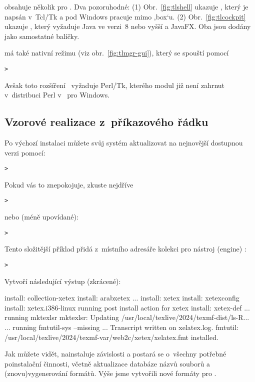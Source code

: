 \documentclass[\classoptions,slovak,english,czech]{\classname}
\newcommand{\singleuv}[1]{,#1`}
\begin{document}
\TL{} obsahuje několik \GUI{} pro . 
Dva pozoruhodné: (1) Obr.~\ref{fig:tlshell} ukazuje ,
který je napsán v~Tcl/Tk a pod Windows pracuje mimo \singleuv{box}u. (2) Obr.~\ref{fig:tlcockpit} ukazuje ,
který vyžaduje Java ve verzi~8 nebo vyšší a JavaFX. 
Oba jsou dodány jako samostatné balíčky.

 má také nativní režimu \GUI{} 
(viz obr.~\ref{fig:tlmgr-gui}), který se spouští pomocí
\begin{alltt}
> 
\end{alltt}
Avšak toto rozšíření \GUI\ vyžaduje Perl/Tk, kterého modul již není
zahrnut v~distribuci Perl v~\TL{} pro Windows.



\subsection{Vzorové realizace  z~příkazového řádku}

Po výchozí instalaci můžete svůj systém aktualizovat
na nejnovější dostupnou verzi pomocí:
\begin{alltt}
> 
\end{alltt}
Pokud vás to znepokojuje, zkuste nejdříve
\begin{alltt}
> 
\end{alltt}
nebo (méně upovídané):
\begin{alltt}
> 
\end{alltt}

Tento složitější příklad přidá z~místního adresáře kolekci
pro nástroj (engine) \XeTeX:

\begin{alltt}
> 
\end{alltt}
Vytvoří následující výstup (zkrácené):
\begin{fverbatim}
install: collection-xetex
install: arabxetex
...
install: xetex
install: xetexconfig
install: xetex.i386-linux
running post install action for xetex
install: xetex-def
...
running mktexlsr
mktexlsr: Updating /usr/local/texlive/2024/texmf-dist/ls-R...
...
running fmtutil-sys --missing
...
Transcript written on xelatex.log.
fmtutil: /usr/local/texlive/2024/texmf-var/web2c/xetex/xelatex.fmt installed.
\end{fverbatim}

Jak můžete vidět,  nainstaluje závislosti
a postará se o~všechny potřebné poinstalační činnosti, 
včetně aktualizace databáze názvů souborů 
a (znovu)vygenerování formátů.  Výše jsme vytvořili
nové formáty pro \XeTeX.
\end{document}
